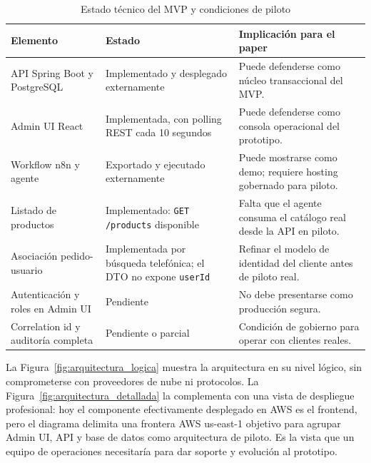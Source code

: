 \begin{table}[htbp]
\centering
\caption{Estado técnico del MVP y condiciones de piloto}%
\label{tab:estado_tecnico}
\small
\begin{tabular}{@{}>{\raggedright\arraybackslash}p{3.5cm}>{\raggedright\arraybackslash}p{4.2cm}>{\raggedright\arraybackslash}p{6cm}@{}}
\toprule
\textbf{Elemento} & \textbf{Estado} & \textbf{Implicación para el paper} \\ \midrule
API Spring Boot y PostgreSQL & Implementado y desplegado externamente & Puede defenderse como núcleo transaccional del MVP\@. \\
Admin UI React & Implementada, con polling REST cada 10 segundos & Puede defenderse como consola operacional del prototipo. \\
Workflow n8n y agente & Exportado y ejecutado externamente & Puede mostrarse como demo; requiere hosting gobernado para piloto. \\
Listado de productos & Implementado: \texttt{GET /products} disponible & Falta que el agente consuma el catálogo real desde la API en piloto. \\
Asociación pedido-usuario & Implementada por búsqueda telefónica; el DTO no expone \texttt{userId} & Refinar el modelo de identidad del cliente antes de piloto real. \\
Autenticación y roles en Admin UI & Pendiente & No debe presentarse como producción segura. \\
Correlation id y auditoría completa & Pendiente o parcial & Condición de gobierno para operar con clientes reales. \\ \bottomrule
\end{tabular}
\end{table}

La Figura~\ref{fig:arquitectura_logica} muestra la arquitectura en su nivel lógico, sin comprometerse con proveedores de nube ni protocolos. La Figura~\ref{fig:arquitectura_detallada} la complementa con una vista de despliegue profesional: hoy el componente efectivamente desplegado en AWS es el frontend, pero el diagrama delimita una frontera AWS us-east-1 objetivo para agrupar Admin UI, API y base de datos como arquitectura de piloto. Es la vista que un equipo de operaciones necesitaría para dar soporte y evolución al prototipo.

